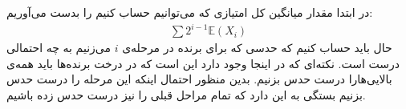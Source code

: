 در ابتدا مقدار میانگین کل امتیازی که می‌توانیم حساب کنیم را بدست می‌آوریم:
\begin{gather*}
    \sum 2^{i-1} \mathbb{E}(X_i)
\end{gather*}
حال باید حساب کنیم که حدسی که برای برنده در مرحله‌ی
$i$
می‌زنیم به چه احتمالی درست است. نکته‌ای که در اینجا وجود دارد این است که در درخت برنده‌ها
باید همه‌ی بالایی‌هارا درست حدس بزنیم. بدین منظور احتمال اینکه این مرحله را درست حدس بزنیم بستگی به این
دارد که تمام مراحل قبلی را نیز درست حدس زده باشیم.



